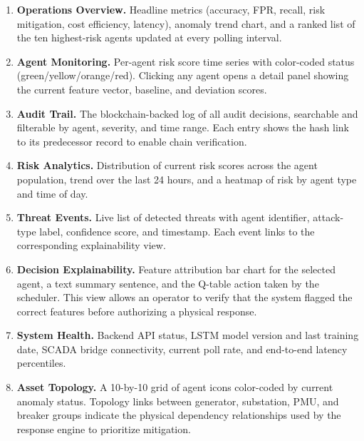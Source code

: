 \begin{enumerate}
    \item \textbf{Operations Overview.} Headline metrics (accuracy, FPR, recall, risk mitigation,
    cost efficiency, latency), anomaly trend chart, and a ranked list of the ten highest-risk agents
    updated at every polling interval.

    \item \textbf{Agent Monitoring.} Per-agent risk score time series with color-coded status
    (green/yellow/orange/red). Clicking any agent opens a detail panel showing the current feature
    vector, baseline, and deviation scores.

    \item \textbf{Audit Trail.} The blockchain-backed log of all audit decisions, searchable and
    filterable by agent, severity, and time range. Each entry shows the hash link to its predecessor
    record to enable chain verification.

    \item \textbf{Risk Analytics.} Distribution of current risk scores across the agent population,
    trend over the last 24 hours, and a heatmap of risk by agent type and time of day.

    \item \textbf{Threat Events.} Live list of detected threats with agent identifier, attack-type
    label, confidence score, and timestamp. Each event links to the corresponding explainability
    view.

    \item \textbf{Decision Explainability.} Feature attribution bar chart for the selected agent,
    a text summary sentence, and the Q-table action taken by the scheduler. This view allows an
    operator to verify that the system flagged the correct features before authorizing a physical
    response.

    \item \textbf{System Health.} Backend API status, LSTM model version and last training date,
    SCADA bridge connectivity, current poll rate, and end-to-end latency percentiles.

    \item \textbf{Asset Topology.} A 10-by-10 grid of agent icons color-coded by current anomaly
    status. Topology links between generator, substation, PMU, and breaker groups indicate the
    physical dependency relationships used by the response engine to prioritize mitigation.
\end{enumerate}

